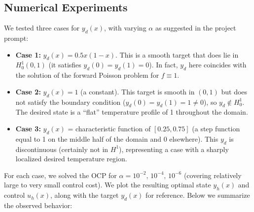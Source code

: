 \documentclass{article}
\begin{document}
\subsection{Numerical Experiments}
We tested three cases for $y_d(x)$, with varying $\alpha$ as suggested in the project prompt:

\begin{itemize}
\item \textbf{Case 1:} $y_d(x) = 0.5x(1-x)$. This is a smooth target that does lie in $H^1_0(0,1)$ (it satisfies $y_d(0)=y_d(1)=0$). In fact, $y_d$ here coincides with the solution of the forward Poisson problem for $f\equiv 1$.
\item \textbf{Case 2:} $y_d(x) = 1$ (a constant). This target is smooth in $(0,1)$ but does not satisfy the boundary condition ($y_d(0)=y_d(1)=1\neq0$), so $y_d\notin H^1_0$. The desired state is a “flat” temperature profile of 1 throughout the domain.
\item \textbf{Case 3:} $y_d(x)$ = characteristic function of $[0.25,0.75]$ (a step function equal to 1 on the middle half of the domain and 0 elsewhere). This $y_d$ is discontinuous (certainly not in $H^1$), representing a case with a sharply localized desired temperature region.
\end{itemize}

For each case, we solved the OCP for $\alpha = 10^{-2},\,10^{-4},\,10^{-6}$ (covering relatively large to very small control cost). We plot the resulting optimal state $y_h(x)$ and control $u_h(x)$, along with the target $y_d(x)$ for reference. Below we summarize the observed behavior:
\end{document}
